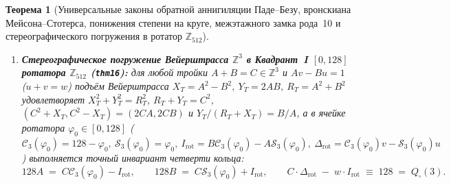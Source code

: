 \documentclass[11pt,a4paper]{article}
\theoremstyle{plain}
\newtheorem{theorem}{Теорема}[section]
\theoremstyle{definition}
\begin{document}
\begin{theorem}[Универсальные законы обратной аннигиляции Паде--Безу, вронскиана Мейсона--Стотерса, понижения степени на круге, межэтажного замка рода~10 и стереографического погружения в ротатор $\mathbb{Z}_{512}$]
\begin{enumerate}[label=\textbf{(\roman*)},leftmargin=*]
  эйлерова характеристика плоской кривой степени $k$ удовлетворяет тождеству $\chi(\mathcal{C}_k) = 2 - 2g(k) = 2 - (k-1)(k-2) \equiv k(3-k)$ (обращаясь в нуль при $k = d = 3$ в соответствии с симплициальным разложением Пуанкаре--Хегора 3-сферы $S^3 = \mathcal{C}_{13}^{(+)}\cup_{O_2(3)}\mathcal{C}_{13}^{(-)}$, где $\chi(\mathcal{C}_{13}) = 13-36+32-8 = +1$, $\chi(O_2(3)) = 12-24+14 = +2 = \chi(\mathcal{C}_2)$ и $\chi(S^3) = 1+1-2 = 0 = \chi(\mathcal{C}_3)$). Сцепление односвязного сферического этажа $k=2$ ($A = A_2 X_2^2,\ B = B_2 Y_2^2,\ C = C_2 Z_2^2$, $g(2)=0,\ \chi(\mathcal{C}_2)=+2$) и торового кубического этажа $k=3$ ($A = A_3 X_3^3,\ B = B_3 Y_3^3,\ C = C_3 Z_3^3$, $g(3)=1,\ \chi(\mathcal{C}_3)=0$) в силу $3-2=+1$ связывает каждый вал ($A A_3^2 X_3^6 = A_2^3 X_2^6$) и переводит $(U_6,V_6,W_6) = (X_2 Y_3 Z_3, Y_2 X_3 Z_3, Z_2 X_3 Y_3)$ на кривую 6-й степени рода $g(6) = \frac{5\times 4}{2} = 10 \ge 2$ с отрицательной эйлеровой характеристикой $\chi(\mathcal{C}_6) = 6(3-6) = -18 < 0$:
  \begin{equation}
    \label{eq:genus-10-curve}
    A_2^3 B_3^2 C_3^2\,U_6^6 \;+\; B_2^3 A_3^2 C_3^2\,V_6^6 \;=\; C_2^3 A_3^2 B_3^2\,W_6^6.
  \end{equation}
\item \textbf{Стереографическое погружение Вейерштрасса $\mathbb{Z}^3$ в Квадрант~I $[0,128]$ ротатора $\mathbb{Z}_{512}$ (\texttt{thm16}):}
  для любой тройки $A+B=C\in\mathbb{Z}^3$ и $A v - B u = 1$ ($u+v=w$) подъём Вейерштрасса $X_T = A^2-B^2,\ Y_T = 2AB,\ R_T = A^2+B^2$ удовлетворяет $X_T^2+Y_T^2=R_T^2$, $R_T+Y_T=C^2$, $(C^2+X_T,C^2-X_T)=(2CA,2CB)$ и $Y_T/(R_T+X_T) = B/A$, а в ячейке ротатора $\varphi_0\in[0,128]$ ($\mathcal{C}_3(\varphi_0)=128-\varphi_0,\ \mathcal{S}_3(\varphi_0)=\varphi_0,\ I_{\mathrm{rot}} = B\mathcal{C}_3(\varphi_0)-A\mathcal{S}_3(\varphi_0),\ \Delta_{\mathrm{rot}} = \mathcal{C}_3(\varphi_0)v-\mathcal{S}_3(\varphi_0)u$) выполняется точный инвариант четверти кольца:
  \begin{equation}
    \label{eq:quarter-ring-invariant}
    128 A \;=\; C\mathcal{C}_3(\varphi_0) - I_{\mathrm{rot}},\qquad
    128 B \;=\; C\mathcal{S}_3(\varphi_0) + I_{\mathrm{rot}},\qquad
    C\cdot\Delta_{\mathrm{rot}} \;-\; w\cdot I_{\mathrm{rot}} \;\equiv\; 128 \;=\; Q_\square(3).
  \end{equation}
\end{enumerate}
\end{theorem}
\end{document}
